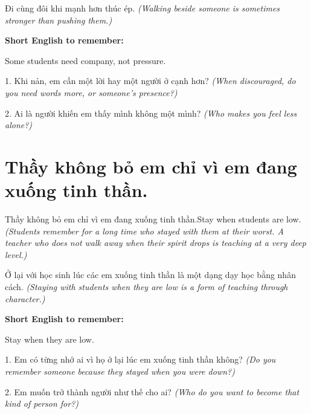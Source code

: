 \begin{baihoc}
Đi cùng đôi khi mạnh hơn thúc ép.
\textit{(Walking beside someone is sometimes stronger than pushing them.)}
\end{baihoc}

\begin{ghinhoanh}
\textbf{Short English to remember:}

Some students need company, not pressure.

\end{ghinhoanh}

\begin{tuhocnhanh}
1. Khi nản, em cần một lời hay một người ở cạnh hơn? \textit{(When discouraged, do you need words more, or someone's presence?)}

2. Ai là người khiến em thấy mình không một mình? \textit{(Who makes you feel less alone?)}
\end{tuhocnhanh}
\ngancach


\section{Thầy không bỏ em chỉ vì em đang xuống tinh thần.}
\begin{truyen}{Thầy không bỏ em chỉ vì em đang xuống tinh thần.}{Stay when students are low.}
\textit{(Students remember for a long time who stayed with them at their worst. A teacher who does not walk away when their spirit drops is teaching at a very deep level.)}
\end{truyen}

\begin{baihoc}
Ở lại với học sinh lúc các em xuống tinh thần là một dạng dạy học bằng nhân cách.
\textit{(Staying with students when they are low is a form of teaching through character.)}
\end{baihoc}

\begin{ghinhoanh}
\textbf{Short English to remember:}

Stay when they are low.

\end{ghinhoanh}

\begin{tuhocnhanh}
1. Em có từng nhớ ai vì họ ở lại lúc em xuống tinh thần không? \textit{(Do you remember someone because they stayed when you were down?)}

2. Em muốn trở thành người như thế cho ai? \textit{(Who do you want to become that kind of person for?)}
\end{tuhocnhanh}
\ngancach


